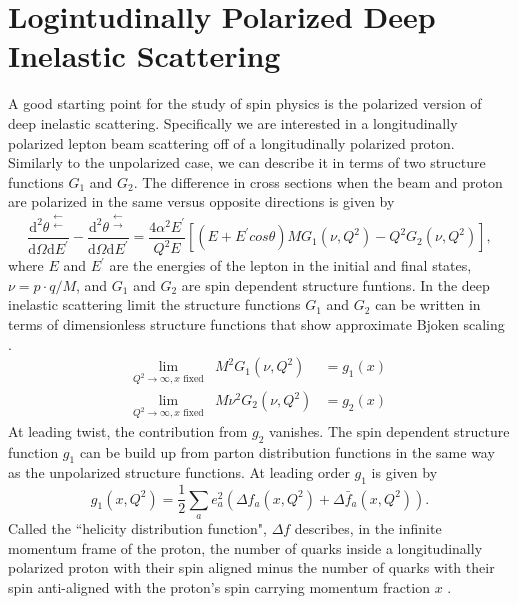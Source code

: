 \documentclass[abstract = on,listof=totoc, bibliography=totoc]{scrreprt}
\begin{document}
\section{Logintudinally Polarized Deep Inelastic Scattering}
A good starting point for the study of spin physics is the polarized version of deep inelastic scattering. Specifically we are interested in a longitudinally polarized lepton beam scattering off of a longitudinally polarized proton. Similarly to the unpolarized case, we can describe it in terms of two structure functions $G_1$ and $G_2$. The difference in cross sections when the beam and proton are polarized in the same versus opposite directions is given by
\begin{equation}
\frac{\text{d}^2 \theta^{\substack{\leftarrow \\ \leftarrow}}}{\text{d} \Omega \text{d}E^{'}} - \frac{\text{d}^2\theta^{\substack{\leftarrow \\ \rightarrow}}}{\text{d}\Omega\text{d}E^{'}} = \frac{4\alpha^2E^{'}}{Q^2E}\left[(E+E^{'}cos\theta)MG_1(\nu,Q^2) - Q^2G_2(\nu,Q^2)\right],
\end{equation}
where $E$ and $E^{'}$ are the energies of the lepton in the initial and final states, $\nu = p\cdot q/M$, and $G_1$ and $G_2$ are spin dependent structure funtions. In the deep inelastic scattering limit the structure functions $G_1$ and $G_2$ can be written in terms of  dimensionless structure functions that show approximate Bjoken scaling \cite{longReviewPaper}. 
\begin{eqnarray}
\lim\limits_{Q^2\rightarrow\infty, x \text{ fixed}}& M^2G_1(\nu,Q^2) &= g_1(x) \label{eq:g1}\\
\lim\limits_{Q^2\rightarrow\infty, x \text{ fixed}}& M\nu^2G_2(\nu,Q^2) &= g_2(x) \label{eq:g2}
\end{eqnarray}
At leading twist, the contribution from $g_2$ vanishes. The spin dependent structure function $g_1$ can be build up from parton distribution functions in the same way as the unpolarized structure functions. At leading order $g_1$ is given by
\begin{equation}
g_1(x,Q^2) = \frac{1}{2} \sum\limits_a e^2_a\left(\Delta f_a(x,Q^2) + \Delta \bar{f}_a(x,Q^2)\right).
\end{equation}
Called the ``helicity distribution function", $\Delta f$ describes, in the infinite momentum frame of the proton, the number of quarks inside a longitudinally polarized proton with their spin aligned minus the number of quarks with their spin anti-aligned with the proton's spin carrying momentum fraction $x$ \cite{longReviewPaper}.
\end{document}
